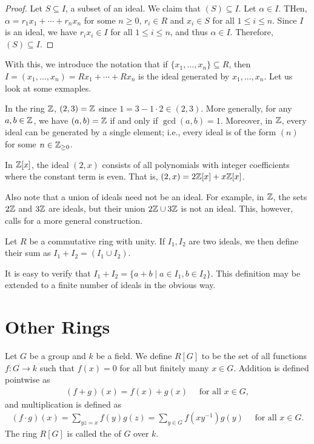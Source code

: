 \begin{proof}
    Let $S \subseteq I$, a subset of an ideal. We claim that $(S) \subseteq I$. Let $\alpha \in I$. THen, $\alpha = r_{1}x_{1} + \cdots + r_{n}x_{n}$ for some $n \geq 0$, $r_{i} \in R$ and $x_{i} \in S$ for all $1 \leq i \leq n$. Since $I$ is an ideal, we have $r_{i}x_{i} \in I$ for all $1 \leq i \leq n$, and thus $\alpha \in I$. Therefore, $(S) \subseteq I$.
\end{proof}

With this, we introduce the notation that if $\{x_{1},\ldots,x_{n}\} \subseteq R$, then $I = (x_{1},\ldots,x_{n}) = Rx_{1} + \cdots + Rx_{n}$ is the ideal generated by $x_{1},\ldots,x_{n}$. Let us look at some exmaples.

\begin{example}
    In the ring $\mathbb{Z}$, $(2,3) = \mathbb{Z}$ since $1 = 3 - 1 \cdot 2 \in (2,3)$. More generally, for any $a, b \in \mathbb{Z}$, we have $(a,b) = \mathbb{Z}$ if and only if $\gcd(a,b) = 1$. Moreover, in $\mathbb{Z}$, every ideal can be generated by a single element; i.e., every ideal is of the form $(n)$ for some $n \in \mathbb{Z}_{\geq 0}$.
\end{example}

\begin{example}
    In $\mathbb{Z}[x]$, the ideal $(2, x)$ consists of all polynomials with integer coefficients where the constant term is even. That is, $(2,x) = 2\mathbb{Z}[x] + x\mathbb{Z}[x]$. 
\end{example}

Also note that a union of ideals need not be an ideal. For example, in $\mathbb{Z}$, the sets $2\mathbb{Z}$ and $3\mathbb{Z}$ are ideals, but their union $2\mathbb{Z} \cup 3\mathbb{Z}$ is not an ideal. This, however, calls for a more general construction.

\begin{definition}
    Let $R$ be a commutative ring with unity. If $I_{1}, I_{2}$ are two ideals, we then define their sum as $I_{1} + I_{2} = (I_{1} \cup I_{2})$.
\end{definition}
It is easy to verify that $I_{1} + I_{2} = \{a + b \mid a \in I_{1}, b \in I_{2}\}$. This definition may be extended to a finite number of ideals in the obvious way.

\section{Other Rings}

\begin{definition}
    Let $G$ be a group and $k$ be a field. We define $R[G]$ to be the set of all functions $f:G \to k$ such that $f(x) = 0$ for all but finitely many $x \in G$. Addition is defined pointwise as
    \begin{align}
        (f + g)(x) = f(x) + g(x) \quad \text{ for all } x \in G,
    \end{align}
    and multiplication is defined as
    \begin{align}
        (f \cdot g)(x) = \sum_{y z = x} f(y) g(z) = \sum_{y \in G} f(xy^{-1}) g(y) \quad \text{ for all } x \in G.
    \end{align}
    The ring $R[G]$ is called the  of $G$ over $k$.
\end{definition}

